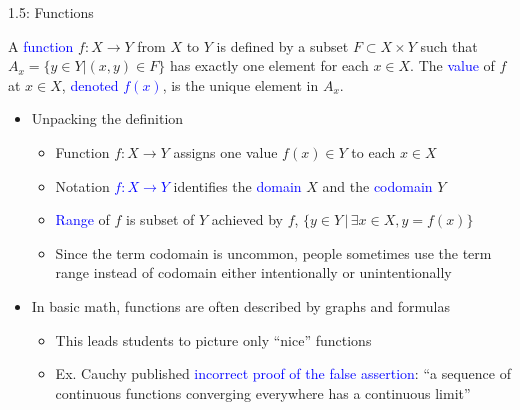 \documentclass[10pt,english,aspectratio=169]{beamer}
\begin{document}
\begin{frame}{1.5: Functions}

\vspace{3mm}

\begin{definition}
A \textcolor{blue}{function} $f \colon X \rightarrow Y$ from $X$ to $Y$ is defined by a subset $F \subset X \times Y$ such that $A_x = \{ y\in Y | (x,y)\in F \}$ has exactly one element for each $x\in X$.
The \textcolor{blue}{value} of $f$ at $x\in X$, \textcolor{blue}{denoted $f(x)$}, is the unique element in $A_x$.
\end{definition}

\begin{itemize}
\setlength\itemsep{3mm}
\item<2-> Unpacking the definition \vspace{1mm}
\begin{itemize} 
  \setlength\itemsep{1.5mm}
  \item<2-> Function $f \colon X\rightarrow Y$ assigns one value $f(x)\in Y$ to each $x\in X$
  \item<3-> Notation \textcolor{blue}{$f \colon X \rightarrow Y$} identifies the \textcolor{blue}{domain} $X$ and the \textcolor{blue}{codomain} $Y$
  \item<4-> \textcolor{blue}{Range} of $f$ is subset of $Y$ achieved by $f$, $\{y \in Y \,|\, \exists x\in X, y=f(x) \}$
  \item<5-> Since the term codomain is uncommon, people sometimes use the term range instead of codomain either intentionally or unintentionally
\end{itemize}

\item<6-> In basic math, functions are often described by graphs and formulas \vspace{1mm}
\begin{itemize} 
  \setlength\itemsep{1.5mm}
  \item<6-> This leads students to picture only ``nice'' functions
  \item<7-> Ex. Cauchy published \textcolor{blue}{incorrect proof of the false assertion}: ``a sequence of continuous functions converging everywhere has a continuous limit''
\end{itemize}

\end{itemize}
\end{frame}  
\end{document}
